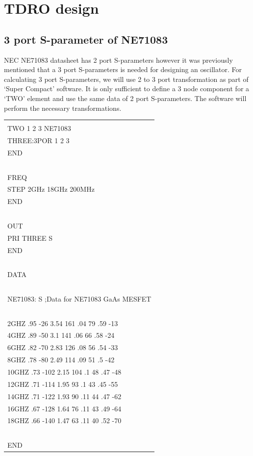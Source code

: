 \hypertarget{tdro-design}{%
\section{TDRO design}\label{tdro-design}}

\hypertarget{port-s-parameter-of-ne71083}{%
\subsection{3 port S-parameter of
NE71083}\label{port-s-parameter-of-ne71083}}

NEC NE71083 datasheet has 2 port S-parameters however it was previously
mentioned that a 3 port S-parameters is needed for designing an
oscillator. For calculating 3 port S-parameters, we will use 2 to 3 port
transformation as part of `Super Compact' software. It is only
sufficient to define a 3 node component for a `TWO' element and use the
same data of 2 port S-parameters. The software will perform the
necessary transformations.

\begin{longtable}[]{@{}l@{}}
\toprule
\endhead
\begin{minipage}[t]{0.97\columnwidth}\raggedright
\begin{quote}
BLK\\
TWO 1 2 3 NE71083\\
THREE:3POR 1 2 3\\
END\\
~\\
FREQ\\
STEP 2GHz 18GHz 200MHz\\
END\\
~\\
OUT\\
PRI THREE S\\
END\\
~\\
DATA\\
~\\
NE71083: S ;Data for NE71083 GaAs MESFET\\
~\\
2GHZ .95 -26 3.54 161 .04 79 .59 -13\\
4GHZ .89 -50 3.1 141 .06 66 .58 -24\\
6GHZ .82 -70 2.83 126 .08 56 .54 -33\\
8GHZ .78 -80 2.49 114 .09 51 .5 -42\\
10GHZ .73 -102 2.15 104 .1 48 .47 -48\\
12GHZ .71 -114 1.95 93 .1 43 .45 -55\\
14GHZ .71 -122 1.93 90 .11 44 .47 -62\\
16GHZ .67 -128 1.64 76 .11 43 .49 -64\\
18GHZ .66 -140 1.47 63 .11 40 .52 -70\\
~\\
END
\end{quote}\strut
\end{minipage}\tabularnewline
\bottomrule
\end{longtable}

